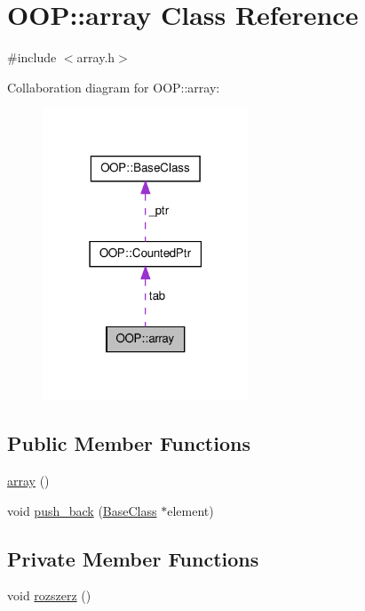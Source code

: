 \hypertarget{classOOP_1_1array}{\section{\-O\-O\-P\-:\-:array \-Class \-Reference}
\label{classOOP_1_1array}
}


{\ttfamily \#include $<$array.\-h$>$}



\-Collaboration diagram for \-O\-O\-P\-:\-:array\-:\nopagebreak
\begin{figure}[H]
\begin{center}
\leavevmode
\includegraphics[width=174pt]{classOOP_1_1array__coll__graph}
\end{center}
\end{figure}
\subsection*{\-Public \-Member \-Functions}
\begin{DoxyCompactItemize}
\item 
\hyperlink{classOOP_1_1array_a387217686b62bffe5f8aac23569573cb}{array} ()
\item 
void \hyperlink{classOOP_1_1array_aacf55ebc981f43f79f14b6346f9a3104}{push\-\_\-back} (\hyperlink{classOOP_1_1BaseClass}{\-Base\-Class} $\ast$element)
\end{DoxyCompactItemize}
\subsection*{\-Private \-Member \-Functions}
\begin{DoxyCompactItemize}
\item 
void \hyperlink{classOOP_1_1array_ab525b43e208a38c090331d59fc19f72c}{rozszerz} ()
\end{DoxyCompactItemize}
